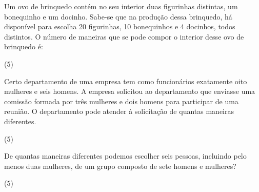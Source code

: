 \documentclass[10pt,a4paper]{article}
\begin{document}



	\begin{multicols}{2}

	  \setlength\columnseprule{0.6pt} %

    \begin{question}[type=exam]
        Um ovo de brinquedo contém no seu interior duas figurinhas distintas, um
        bonequinho e um docinho. Sabe-se que na produção dessa brinquedo, há
        disponível para escolha 20 figurinhas, 10 bonequinhos e 4 docinhos, todos
        distintos. O número de maneiras que se pode compor o interior desse ovo de
        brinquedo é:
        \begin{tasks}(5)
        \end{tasks}
    \end{question}

    \begin{question}[type=exam]
        Certo departamento de uma empresa tem como funcionários exatamente
        oito mulheres e seis homens. A empresa solicitou ao departamento que
        enviasse uma comissão formada por três mulheres e dois homens para
        participar de uma reunião. O departamento pode atender à solicitação
        de quantas maneiras diferentes.

        \begin{tasks}(5)
        \end{tasks}
    \end{question}

    \begin{question}[type=exam]
        De quantas maneiras diferentes podemos escolher seis pessoas, incluindo
        pelo menos duas mulheres, de um grupo composto de sete homens e mulheres?
        \begin{tasks}(5)
        \end{tasks}
    \end{question}


\end{multicols}
\end{document}
